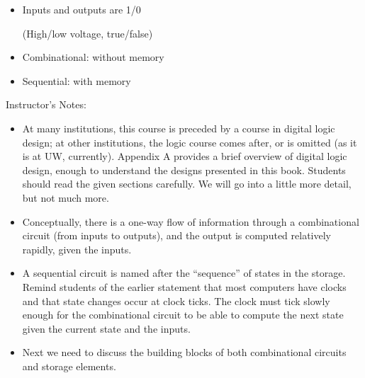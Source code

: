 \begin{frame}[fragile]
\begin{itemize}
    \item Inputs and outputs are 1/0

		(High/low voltage, true/false)
	\item Combinational: without memory
	\item Sequential: with memory
	
\end{itemize}
\end{frame}
\BNotes\ifnum{}
\begin{frame}[fragile]
Instructor's Notes:
\begin{itemize}
\item At many institutions, this course is preceded by a course in
	digital logic design; at other institutions, the logic course comes
	after, or is omitted (as it is at UW, currently). Appendix A provides a
	brief overview of digital logic design, enough to understand the designs
	presented in this book. Students should read the given sections
	carefully. We will go into a little more detail, but not much more.
\item	Conceptually, there is a one-way flow of information through a
	combinational circuit (from inputs to outputs), and the output is
	computed relatively rapidly, given the inputs.
\item   A sequential circuit is named after the ``sequence'' of states
	in the storage. Remind students of the earlier statement that most
	computers have clocks and that state changes occur at clock ticks. The
	clock must tick slowly enough for the combinational circuit to be able
	to compute the next state given the current state and the inputs.
\item Next we need to discuss the building blocks of both
	combinational circuits and storage elements.
\end{itemize}
\end{frame}
\fi\ENotes


